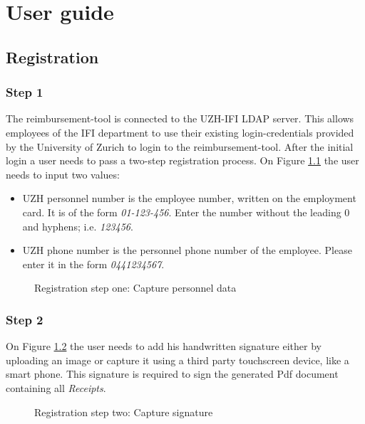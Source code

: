     \chapter{User guide}

\section{Registration}
\label{sec:registration}

\subsection{Step 1}
The reimbursement-tool is connected to the UZH-IFI LDAP server. This allows employees of the IFI department to use their existing login-credentials provided by the University of Zurich to login to the reimbursement-tool.\newline
After the initial login a user needs to pass a two-step registration process. On Figure \ref{fig:registration-step01} the user needs to input two values:
\begin{itemize}
    \item UZH personnel number is the employee number, written on the employment card. It is of the form \textit{01-123-456}. Enter the number without the leading 0 and hyphens; i.e. \textit{123456}.
    \item UZH phone number is the personnel phone number of the employee. Please enter it in the form \textit{0441234567}.
\end{itemize}\newpage


\begin{figure}[H]
    \centering
    \caption{Registration step one: Capture personnel data}
    \label{fig:registration-step01}
\end{figure}

\subsection{Step 2}
On Figure \ref{fig:registration-step02} the user needs to add his handwritten signature either by uploading an image or capture it using a third party touchscreen device, like a smart phone. This signature is required to sign the generated Pdf document containing all \textit{Receipts}.

\begin{figure}[H]
    \centering
    \caption{Registration step two: Capture signature}
    \label{fig:registration-step02}
\end{figure}

